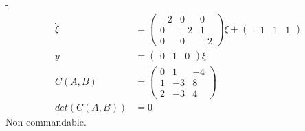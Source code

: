 \documentclass[../main.tex]{subfiles}
\begin{document}
\bigbreak
{}- \begin{align*}
\dot{\xi} &= \begin{pmatrix}-2&0&0\\0&-2&1\\0&0&-2\end{pmatrix}\xi + \begin{pmatrix}-1&1&1\end{pmatrix}\\
y &= \begin{pmatrix}0&1&0\end{pmatrix} \xi\\
C(A,B) &= \begin{pmatrix}0&1&-4\\1&-3&8\\2&-3&4\end{pmatrix}\\
det(C(A,B)) &= 0
\end{align*}
Non commandable.
\end{document}
